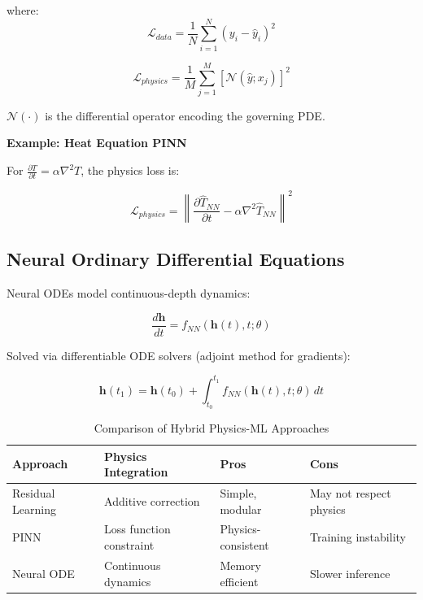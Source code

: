 \documentclass[12pt,a4paper]{article}
\begin{document}
where:
\begin{equation}
\mathcal{L}_{data} = \frac{1}{N}\sum_{i=1}^{N}(y_i - \hat{y}_i)^2
\end{equation}

\begin{equation}
\mathcal{L}_{physics} = \frac{1}{M}\sum_{j=1}^{M}\left[\mathcal{N}(\hat{y}; x_j)\right]^2
\end{equation}

$\mathcal{N}(\cdot)$ is the differential operator encoding the governing PDE.

\textbf{Example: Heat Equation PINN}

For $\frac{\partial T}{\partial t} = \alpha \nabla^2 T$, the physics loss is:

\begin{equation}
\mathcal{L}_{physics} = \left\|\frac{\partial \hat{T}_{NN}}{\partial t} - \alpha \nabla^2 \hat{T}_{NN}\right\|^2
\end{equation}

\subsection{Neural Ordinary Differential Equations}

Neural ODEs model continuous-depth dynamics:

\begin{equation}
\frac{d\mathbf{h}}{dt} = f_{NN}(\mathbf{h}(t), t; \theta)
\end{equation}

Solved via differentiable ODE solvers (adjoint method for gradients):

\begin{equation}
\mathbf{h}(t_1) = \mathbf{h}(t_0) + \int_{t_0}^{t_1} f_{NN}(\mathbf{h}(t), t; \theta) \, dt
\end{equation}

\begin{table}[H]
\centering
\caption{Comparison of Hybrid Physics-ML Approaches}
\begin{tabular}{llll}
\toprule
\textbf{Approach} & \textbf{Physics Integration} & \textbf{Pros} & \textbf{Cons} \\
\midrule
Residual Learning & Additive correction & Simple, modular & May not respect physics \\
PINN & Loss function constraint & Physics-consistent & Training instability \\
Neural ODE & Continuous dynamics & Memory efficient & Slower inference \\
\bottomrule
\end{tabular}
\end{table}
\end{document}
